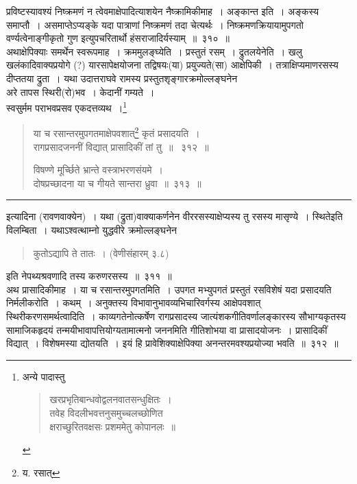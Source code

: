 \documentclass[11pt, openany]{book}
\begin{document}
प्रविष्टस्यावश्यं निष्क्रमणं न त्वेवमाक्षेपादित्याशयेन नैष्क्रामिकीमाह~। {\qtt अङ्कान्त} इति~। अङ्कस्य समाप्तौ~। असमाप्तेऽप्यङ्के यदा पात्राणां निष्क्रमणं तदा चेत्यर्थः~। निष्क्रमणक्रियायामुपगतो वर्ण्यत्वेनाङ्गीकृतो गुण इत्युपचरितार्थो हंसराजादिर्यस्याम्~॥~३१०~॥\\

अथाक्षेपिक्याः समर्थेन स्वरूपमाह~। {\qtt क्रममुलङ्घ्येति}~। प्रस्तुतं रसम्~। {\qtt द्रुतलयेनेति}~। खलु खलंकादिवाक्यप्रयोगे (?) यारसापेक्षयोजना तद्विषयः(या) प्रयुज्यते(सा) {\qtt आक्षेपिकी}~। तत्राक्षिप्यमाणरसस्य दीप्ततया {\qtt द्रुता}~। यथा {\qtt उदात्तराघवे} रामस्य प्रस्तुतशृङ्गारक्रमोल्लङ्घनेन \\
{\qtt अरे तापस स्थिरी(रो)भव~। केदानीं गम्यते~। }\\
{\qtt स्वसुर्मम पराभवप्रसव एकदत्तव्यथ~।}\renewcommand{\thefootnote}{*}\footnote{अन्ये पादास्तु\textendash
\begin{quote}
{\qt खरप्रभृतिबान्धवोद्वलनवातसन्धुक्षितः~।\\
तवेह विदलीभवत्तनुसमुच्चलच्छोणित\\
क्षराच्छुरितवक्षसः प्रशममेतु कोपानलः~॥}
\end{quote}}

\newpage

\begin{quote}
{\na या च रसान्तरमुपगतमाक्षेपवशात्\renewcommand{\thefootnote}{1}\footnote{य. रसात्} कृतं प्रसादयति~। \\
 रागप्रसादजननीं विद्यात् प्रासादिकीं तां तु~॥~ ३१२~॥

 विषण्णे मूर्च्छिते भ्रान्ते वस्त्राभरणसंयमे~।\\
 दोषप्रच्छादना या च गीयते सान्तरा ध्रुवा~॥~३१३~॥}
\end{quote}

\hrule

\vspace{2mm}
\noindent
इत्यादिना (रावणवाक्येन)~। यथा ({\qtt द्रुता})वाक्याकर्णनेन वीररसस्याक्षेप्यस्य तु रसस्य मासृण्ये~। {\qtt स्थितेइति} विलम्बिता~। यथाऽ{\qtt श्वत्थाम्नो युद्धवीरे} क्रमोल्लङ्घनेन

\begin{quote}
{\qt कुतोऽद्यापि ते तातः~। (वेणीसंहारम् ३.८) }
\end{quote}

\noindent
इति नेपथ्यश्रवणादि तस्य करुणरसस्य~॥~३११~॥\\

अथ {\qtt प्रासादिकीमाह~। या च रसान्तरमुपगतमिति~। उपगत} मभ्युपगतं प्रस्तुतं रसविशेषं यदा {\qtt प्रसादयति} निर्मलीकरोति~। कथम्~। अनुक्तस्य विभावानुभावव्यभिचारिवर्गस्य {\qtt आक्षेपवशात्} स्थिरीकरणसमर्थत्वादिति~। काव्यगतेनोत्कर्षेण रागप्रसादस्य जात्यंशकगीतिवर्णालङ्कारस्य सौभाग्यकृतस्य सामाजिकहृदयं तन्मयीभावापत्तियोग्यतामात्मनो जननमिति गीतिशोभया वा प्रासादयोजनः~। प्रासादिकीं विद्यात्~। विशेषमस्या द्योतयति~। इयं हि प्रावेशिक्याक्षेपिक्या अनन्तरमवश्यप्रयोज्या भवति~॥~३१२~॥\\
\end{document}

